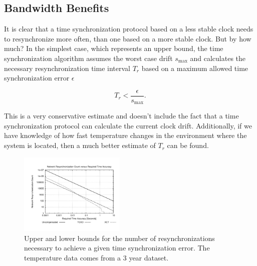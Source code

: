 \subsection{Bandwidth Benefits}

It is clear that a time synchronization protocol based on a less
stable clock needs to resynchronize more often, than one based on
a more stable clock. But by how much? In the simplest case,
which represents an upper bound, the time synchronization algorithm assumes
the worst case drift $s_{\max}$ and calculates the necessary resynchronization
time interval $T_r$ based on a maximum allowed time synchronization error
$\epsilon$

\begin{equation}
    T_r < \frac{\epsilon}{s_{\max}}.
\end{equation}

This is a very conservative estimate and doesn't include the fact that a time
synchronization protocol can calculate the current clock drift. Additionally,
if we have knowledge of how fast temperature changes in the environment where
the system is located, then a much better estimate of $T_r$ can be found. 

\begin{figure}
    \begin{center}
        \includegraphics[angle=-90,width=0.45\textwidth]{figures/mosscamresync}
        \caption{Upper and lower bounds for the number of resynchronizations
        necessary to achieve a given time synchronization error. The
        temperature data comes from a 3 year dataset.}
        \label{fig:resync}
    \end{center}
\end{figure}

